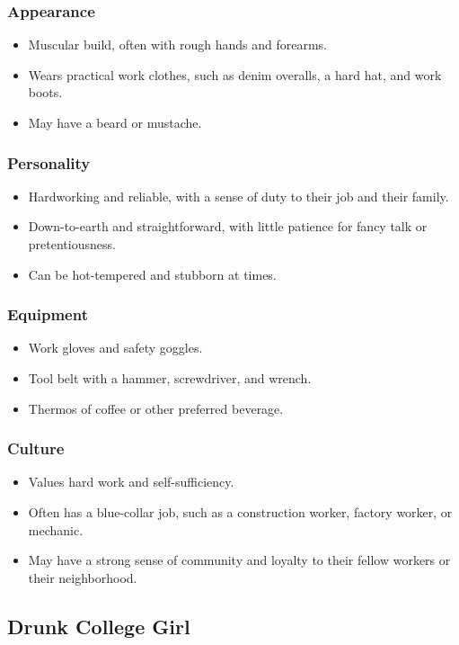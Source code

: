 \documentclass{book}
\begin{document}
\subsubsection{Appearance}
\begin{itemize}
    \item Muscular build, often with rough hands and forearms.
    \item Wears practical work clothes, such as denim overalls, a hard hat, and work boots.
    \item May have a beard or mustache.
\end{itemize}
\subsubsection{Personality}
\begin{itemize}
    \item Hardworking and reliable, with a sense of duty to their job and their family.
    \item Down-to-earth and straightforward, with little patience for fancy talk or pretentiousness.
    \item Can be hot-tempered and stubborn at times.
\end{itemize}
\subsubsection{Equipment}
\begin{itemize}
    \item Work gloves and safety goggles.
    \item Tool belt with a hammer, screwdriver, and wrench.
    \item Thermos of coffee or other preferred beverage.
\end{itemize}
\subsubsection{Culture}
\begin{itemize}
    \item Values hard work and self-sufficiency.
    \item Often has a blue-collar job, such as a construction worker, factory worker, or mechanic.
    \item May have a strong sense of community and loyalty to their fellow workers or their neighborhood.
\end{itemize}

\subsection{Drunk College Girl}
\end{document}
